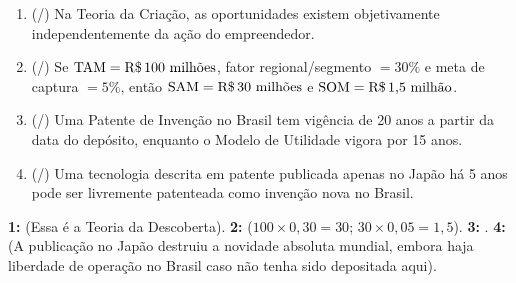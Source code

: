 \begin{boxTeste}
  \begin{enumerate}[leftmargin=1.5em, itemsep=4pt]
    \item (\V/\F) Na Teoria da Criação, as oportunidades existem objetivamente independentemente da ação do empreendedor.
    \item (\V/\F) Se $\text{TAM} = \text{R\$\,100 milhões}$, fator regional/segmento $= 30\%$ e meta de captura $= 5\%$, então $\text{SAM} = \text{R\$\,30 milhões}$ e $\text{SOM} = \text{R\$\,1,5 milhão}$.
    \item (\V/\F) Uma Patente de Invenção no Brasil tem vigência de 20 anos a partir da data do depósito, enquanto o Modelo de Utilidade vigora por 15 anos.
    \item (\V/\F) Uma tecnologia descrita em patente publicada apenas no Japão há 5 anos pode ser livremente patenteada como invenção nova no Brasil.
  \end{enumerate}
  \begin{boxGabarito}
    \textbf{1: \F} (Essa é a Teoria da Descoberta). \quad \textbf{2: \V} ($100 \times 0{,}30 = 30$; $30 \times 0{,}05 = 1{,}5$). \quad \textbf{3: \V}. \quad \textbf{4: \F} (A publicação no Japão destruiu a novidade absoluta mundial, embora haja liberdade de operação no Brasil caso não tenha sido depositada aqui).
  \end{boxGabarito}
\end{boxTeste}
